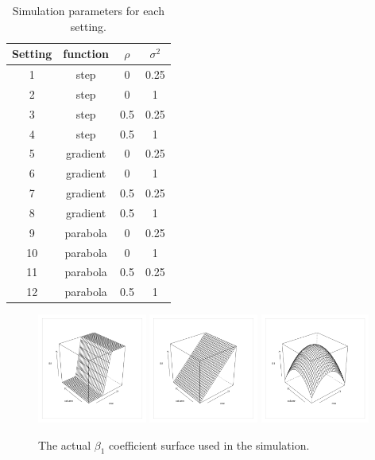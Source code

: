 \documentclass[authoryear, review, 11pt]{elsarticle}
\begin{document}
\begin{table}[h!]
	\begin{center}
	\begin{tabular}{cccc}
		\hline
		Setting & function & $\rho$ & $\sigma^2$ \\ 
		\hline
		1 & step & 0 & 0.25 \\ 
		2 & step & 0 & 1 \\ 
		3 & step & 0.5 & 0.25 \\ 
		4 & step & 0.5 & 1 \\ 
		5 & gradient & 0 & 0.25 \\ 
		6 & gradient & 0 & 1 \\ 
		7 & gradient & 0.5 & 0.25 \\ 
		8 & gradient & 0.5 & 1 \\ 
		9 & parabola & 0 & 0.25 \\ 
		10 & parabola & 0 & 1 \\ 
		11 & parabola & 0.5 & 0.25 \\ 
		12 & parabola & 0.5 & 1 
	\end{tabular}
	\end{center}
	\caption{Simulation parameters for each setting.\label{table:simulation_settings}}
\end{table}

	\begin{figure}
		\begin{center}
			\includegraphics[width=0.32\textwidth]{../../figures/simulation/step.pdf}
			\includegraphics[width=0.32\textwidth]{../../figures/simulation/gradient.pdf}
			\includegraphics[width=0.32\textwidth]{../../figures/simulation/parabola.pdf}
			\caption{The actual $\beta_1$ coefficient surface used in the simulation.\label{fig:sim-actual}}
		\end{center}
	\end{figure}
	
\end{document}
